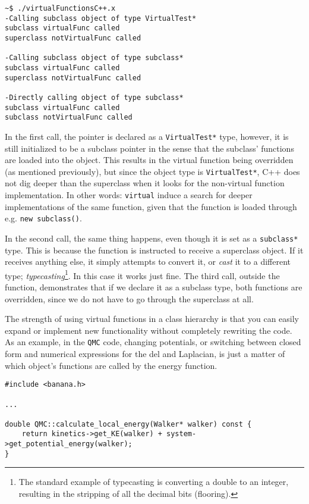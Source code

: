 \vspace{0.5 cm}


\begin{verbatim}
~$ ./virtualFunctionsC++.x 
-Calling subclass object of type VirtualTest*
subclass virtualFunc called
superclass notVirtualFunc called

-Calling subclass object of type subclass*
subclass virtualFunc called
superclass notVirtualFunc called

-Directly calling object of type subclass*
subclass virtualFunc called
subclass notVirtualFunc called
\end{verbatim}

In the first call, the pointer is declared as a \verb+VirtualTest*+ type, however, it is still initialized to be a subclass pointer in the sense that the subclass' functions are loaded into the object. This results in the virtual function being overridden (as mentioned previously), but since the object type is \verb+VirtualTest*+, C++ does not dig deeper than the superclass when it looks for the non-virtual function implementation. In other words: \verb+virtual+ induce a search for deeper implementations of the same function, given that the function is loaded through e.g. \verb+new subclass()+. 

In the second call, the same thing happens, even though it is set as a \verb+subclass*+ type. This is because the function is instructed to receive a superclass object. If it receives anything else, it simply attempts to convert it, or \textit{cast} it to a different type; \textit{typecasting}\footnote{The standard example of typecasting is converting a double to an integer, resulting in the stripping of all the decimal bits (flooring).}. In this case it works just fine. The third call, outside the function, demonstrates that if we declare it as a subclass type, both functions are overridden, since we do not have to go through the superclass at all.

The strength of using virtual functions in a class hierarchy is that you can easily expand or implement new functionality without completely rewriting the code. As an example, in the \verb+QMC+ code, changing potentials, or switching between closed form and numerical expressions for the del and Laplacian, is just a matter of which object's functions are called by the energy function.

\vspace{0.5 cm}
\begin{lstlisting}
#include <banana.h>

...

double QMC::calculate_local_energy(Walker* walker) const {
    return kinetics->get_KE(walker) + system->get_potential_energy(walker);
}
\end{lstlisting}

